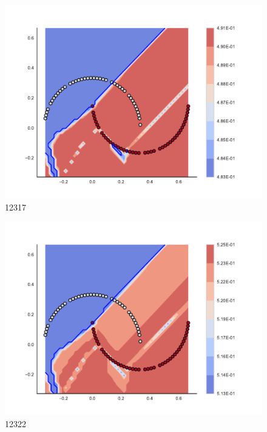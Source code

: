 \begin{subfigure}[b]{0.09\textwidth}
    \includegraphics[clip, trim=2.35cm 1.75cm 4.5cm 0cm,width=\textwidth]{img/convergence/12317.pdf}
    \caption{12317}
    \label{fig:convergence_12317}
\end{subfigure}
%
\begin{subfigure}[b]{0.09\textwidth}
    \includegraphics[clip, trim=2.35cm 1.75cm 4.5cm 0cm,width=\textwidth]{img/convergence/12322.pdf}
    \caption{12322}
    \label{fig:convergence_12322}
\end{subfigure}
%

